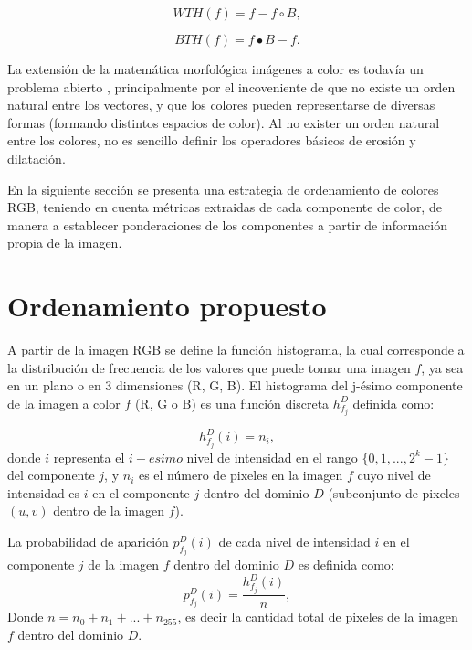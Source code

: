\begin{equation}
WTH(f) = f - f\circ B,
\end{equation}

\begin{equation}
BTH(f) = f\bullet B - f. 
\end{equation}

La extensi\'on de la matem\'atica morfol\'ogica imágenes a color es todav\'ia un problema abierto \cite{aptoula2007pseudo}, principalmente por el incoveniente de que no existe un orden natural entre los vectores, y que los colores pueden representarse de diversas formas (formando distintos espacios de color). Al no exister un orden natural entre los colores, no es sencillo definir los operadores básicos de erosión y dilatación.  

En la siguiente secci\'on se presenta una estrategia de ordenamiento de colores RGB, teniendo en cuenta m\'etricas extraidas de cada componente de color, de manera a establecer ponderaciones de los componentes a partir de informaci\'on propia de la imagen.



 \section{Ordenamiento propuesto}

A partir de la imagen RGB se define la función histograma, la cual corresponde a la distribución de frecuencia de los valores que puede tomar una imagen $f$, ya sea en un plano o en 3 dimensiones (R, G, B).  El histograma del j-ésimo componente de la imagen a color $f$ (R, G o B) es una funci\'on discreta $h_{f_j}^{D}$ definida como:%

\begin{equation}
\label{histograma}
   h_{f_j}^{D}(i) = n_i,
\end{equation} 
donde ${i}$ representa el $i-esimo$ nivel de intensidad en el rango $\{0,1,...,2^k-1\}$ del componente $j$, y $n_i$ es el n\'umero de pixeles en la imagen $f$ cuyo nivel de intensidad es $i$ en el componente $j$ dentro del dominio $D$ (subconjunto de pixeles $(u,v)$ dentro de la imagen $f$).

La probabilidad de aparici\'on $p_{f_j}^{D}(i)$ de cada nivel de intensidad $i$ en el componente $j$ de la imagen $f$ dentro del dominio $D$ es definida como:
\begin{equation}
\label{probabilidad}
   p_{f_j}^{D}(i) = \frac{h_{f_j}^{D}(i)}{n},
\end{equation} Donde $n = n_0 + n_1 + ... + n_{255}$, es decir la cantidad total de pixeles de la imagen $f$ dentro del dominio $D$. 


